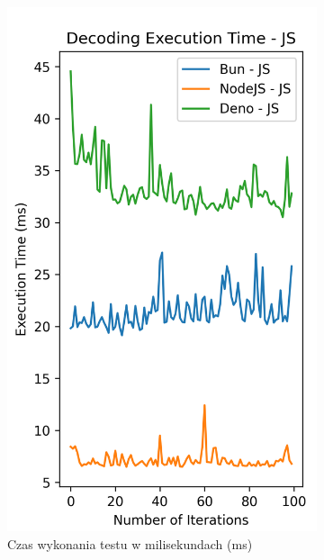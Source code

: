 \begin{figure}[H]
  \centering
  \begin{subfigure}[b]{0.42\textwidth}
    \centering
    \includegraphics[width=\textwidth]{Figures/coding/base64_100_decoding_js_time.png}
    \caption{Czas wykonania testu w milisekundach (ms)}
    \label{fig:decoding_e1_js_time}
  \end{subfigure}
  \begin{subfigure}[b]{0.42\textwidth}
    \centering

\end{subfigure}
\end{figure}
